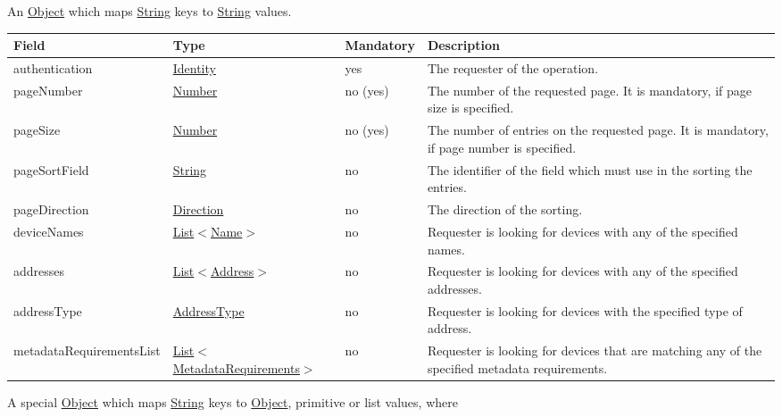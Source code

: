 \documentclass[a4paper]{arrowhead}
\newcommand{\pref}[1]{{\textcolor{ArrowheadGrey}{\hyperref[sec:model:primitives:#1]{#1}}}}
\begin{document}
An \pref{Object} which maps \pref{String} keys to \pref{String} values.

\clearpage

\label{sec:model:DeviceQueryRequest}

\begin{table}[ht!]
\begin{tabularx}{\textwidth}{| p{4.1cm} | p{4.8cm} | p{2cm} | X |} \hline
\rowcolor{gray!33} Field & Type & Mandatory & Description \\ \hline
authentication & \hyperref[sec:model:Identity]{Identity} & yes & The requester of the operation. \\ \hline
pageNumber & \pref{Number} & no (yes) & The number of the requested page. It is mandatory, if page size is specified. \\ \hline
pageSize & \pref{Number} & no (yes) & The number of entries on the requested page. It is mandatory, if page number is specified. \\ \hline
pageSortField & \pref{String} & no & The identifier of the field which must use in the sorting the entries. \\ \hline
pageDirection & \pref{Direction} & no & The direction of the sorting. \\ \hline
deviceNames &  \pref{List}$<$\pref{Name}$>$ & no & Requester is looking for devices with any of the specified names. \\ \hline
addresses &  \pref{List}$<$\pref{Address}$>$ & no & Requester is looking for devices with any of the specified addresses.   \\ \hline
addressType &  \pref{AddressType} & no & Requester is looking for devices with the specified type of address. \\ \hline
metadataRequirementsList & \pref{List}$<$\hyperref[sec:model:MetadataRequirements]{MetadataRequirements}$>$ & no & Requester is looking for devices that are matching any of the specified metadata requirements. \\ \hline
\end{tabularx}
\end{table}

\label{sec:model:MetadataRequirements}

A special \pref{Object} which maps \pref{String} keys to \pref{Object}, primitive or list values, where 
\end{document}

